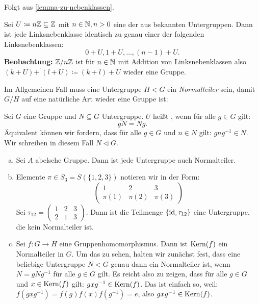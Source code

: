 \begin{beweis}
  Folgt aus \ref{lemma-zu-nebenklassen}.
\end{beweis}

\begin{beispiel}
  Sei \(U\coloneq n\mathbb{Z}\subseteq \mathbb{Z}\) mit \(n\in\mathbb{N}, n>0\) eine der aus  bekannten Untergruppen.
  Dann ist jede Linksnebenklasse identisch zu genau einer der folgenden Linksnebenklassen:
  \[0+U, 1+U,\dots, (n-1)+U. \]
  \textbf{Beobachtung: } \(\mathbb{Z}/n\mathbb{Z}\) ist für \(n\in\mathbb{N}\) mit Addition von Linksnebenklassen also \((k+U)+^\prime (l+U)\coloneq (k+l)+U\) wieder eine Gruppe.
\end{beispiel}

Im Allgemeinen Fall muss eine Untergruppe \(H<G\) ein \emph{Normalteiler} sein, damit \(G/H\) auf eine natürliche Art wieder eine Gruppe ist:

\begin{definition}
  Sei \(G\) eine Gruppe und \(N\subseteq G\) Untergruppe.
  \(U\) heißt , wenn für alle \(g\in G\) gilt:
    \[gN=Ng.\]
    Äquivalent können wir fordern, dass für alle \(g\in G\) und \(n\in N\) gilt: \(gng^{-1}\in N\).
    Wir schreiben in diesem Fall \(N\triangleleft G\).
\end{definition}

\begin{beispiel}
  \begin{enumerate}[(a)]
  \item Sei \(A\) abelsche Gruppe. Dann ist jede Untergruppe auch Normalteiler.
  \item Elemente \(\pi\in S_3=S(\{1,2,3\})\) notieren wir in der Form:
    \[\left(
    \begin{array}{ccc}
      1 & 2 & 3 \\
      \pi(1) & \pi(2) & \pi(3)
    \end{array}
    \right)\]
    Sei \(\tau_{12}=\left(
    \begin{array}{ccc}
      1 & 2 & 3 \\
      2 & 1 & 3
    \end{array}
    \right)\). Dann ist die Teilmenge \(\{\mathrm{id},\tau_{12}\}\) eine Untergruppe, die kein Normalteiler ist.
  \item Sei \(f:G\to H\) eine Gruppenhomomorphismus. Dann ist \(\mathrm{Kern}(f)\) ein Normalteiler in \(G\). Um das zu sehen, halten wir zunächst fest, dass eine beliebige Untergruppe \(N<G\) genau dann ein Normalteiler ist, wenn \(N=gNg^{-1}\) für alle \(g\in G\) gilt. Es reicht also zu zeigen, dass für alle \(g\in G\) und \(x\in \mathrm{Kern}(f)\) gilt: \(gxg^{-1}\in \mathrm{Kern}(f)\). Das ist einfach so, weil: \(f(gxg^{-1})=f(g)f(x)f(g^{-1})=e\), also \(gxg^{-1}\in\mathrm{Kern}(f)\).
  \end{enumerate}
\end{beispiel}

